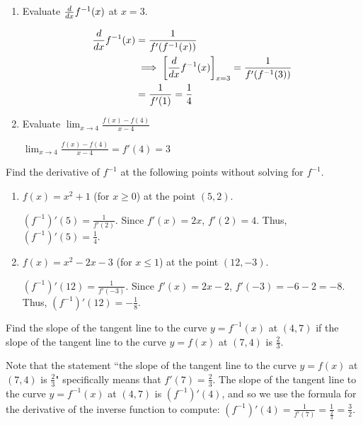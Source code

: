 \documentclass[nooutcomes]{ximera}
\begin{document}
\begin{problem}
\begin{enumerate}
    \item Evaluate $\frac{d}{dx} f^{-1}(x)$ at $x = 3$.
      \begin{freeResponse}
        \begin{align*}
          \frac{d}{dx} f^{-1}(x) &= \frac{1}{f'(f^{-1}(x))} \\
          &\implies \bigg[ \frac{d}{dx} f^{-1}(x) \bigg]_{x = 3} = \frac{1}{f'(f^{-1}(3))} \\
          &= \frac{1}{f'(1)} = \frac{1}{4}
        \end{align*}
      \end{freeResponse}
      
      \item Evaluate $\lim_{x \to 4} \frac{f(x)-f(4)}{x-4}$
      \begin{freeResponse}
$\lim_{x \to 4} \frac{f(x)-f(4)}{x-4} = f'(4)=3$
      \end{freeResponse}
  \end{enumerate}
\end{problem}


\begin{problem}
Find the derivative of $f^{-1}$ at the following points without solving for $f^{-1}$.
	\begin{enumerate}
	
	\item  $f(x) = x^2 + 1$ (for $x \geq 0$) at the point $(5,2)$.  
		\begin{freeResponse}
		$(f^{-1})'(5) = \frac{1}{f'(2)}$.  Since $f'(x) = 2x$, $f'(2) = 4$.  Thus, $(f^{-1})'(5) = \frac{1}{4}$.  
		\end{freeResponse}

	\item  $f(x) = x^2 - 2x - 3$ (for $x \leq 1$) at the point $(12, -3)$.  
		\begin{freeResponse}
		$(f^{-1})'(12) = \frac{1}{f'(-3)}$.  Since $f'(x) = 2x - 2$, $f'(-3) = -6 - 2 = -8$.  Thus, $(f^{-1})'(12) = - \frac{1}{8}$. 
		\end{freeResponse}
	\end{enumerate}
\end{problem}


\begin{problem}

  Find the slope of the tangent line to the curve $y = f^{-1}(x)$ at $(4,7)$ if the slope of the tangent line to the curve $y=f(x)$ at $(7,4)$ is $\frac{2}{3}$.
  \begin{freeResponse}
    Note that the statement ``the slope of the tangent line to the curve $y=f(x)$ at $(7,4)$ is $\frac{2}{3}$" specifically means that $f'(7) = \frac{2}{3}$.
    The slope of the tangent line to the curve $y = f^{-1}(x)$ at $(4,7)$ is $(f^{-1})'(4)$, and so we use the formula for the derivative of the inverse function to compute: $(f^{-1})'(4) = \frac{1}{f'(7)} = \frac{1}{\frac{2}{3}} = \frac{3}{2}$.
  \end{freeResponse}
\end{problem}
\end{document}
